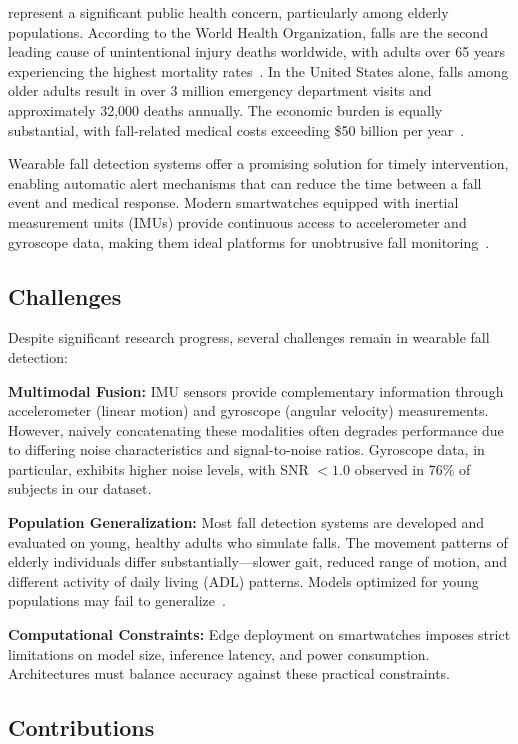 \documentclass[journal,12pt]{IEEEtran}
\begin{document}
 represent a significant public health concern, particularly among elderly populations. According to the World Health Organization, falls are the second leading cause of unintentional injury deaths worldwide, with adults over 65 years experiencing the highest mortality rates~\cite{who_falls}. In the United States alone, falls among older adults result in over 3 million emergency department visits and approximately 32,000 deaths annually. The economic burden is equally substantial, with fall-related medical costs exceeding \$50 billion per year~\cite{florence2018medical}.

Wearable fall detection systems offer a promising solution for timely intervention, enabling automatic alert mechanisms that can reduce the time between a fall event and medical response. Modern smartwatches equipped with inertial measurement units (IMUs) provide continuous access to accelerometer and gyroscope data, making them ideal platforms for unobtrusive fall monitoring~\cite{wang2020deep}.

\subsection{Challenges}

Despite significant research progress, several challenges remain in wearable fall detection:

\textbf{Multimodal Fusion:} IMU sensors provide complementary information through accelerometer (linear motion) and gyroscope (angular velocity) measurements. However, naively concatenating these modalities often degrades performance due to differing noise characteristics and signal-to-noise ratios. Gyroscope data, in particular, exhibits higher noise levels, with SNR $< 1.0$ observed in 76\% of subjects in our dataset.

\textbf{Population Generalization:} Most fall detection systems are developed and evaluated on young, healthy adults who simulate falls. The movement patterns of elderly individuals differ substantially---slower gait, reduced range of motion, and different activity of daily living (ADL) patterns. Models optimized for young populations may fail to generalize~\cite{kwolek2014human}.

\textbf{Computational Constraints:} Edge deployment on smartwatches imposes strict limitations on model size, inference latency, and power consumption. Architectures must balance accuracy against these practical constraints.

\subsection{Contributions}
\end{document}

